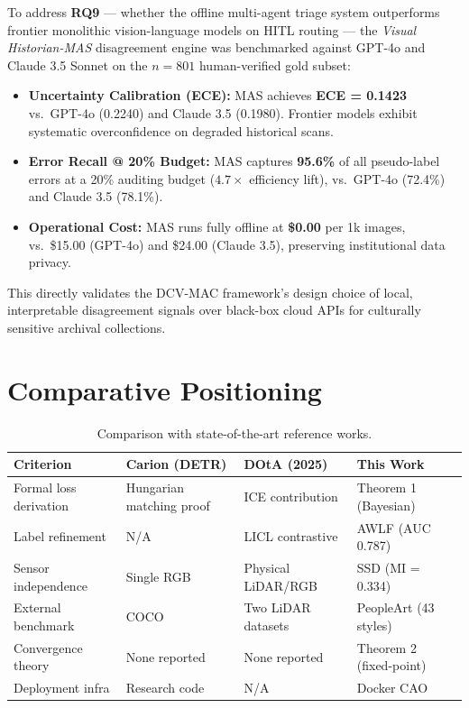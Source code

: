 \documentclass[11pt,a4paper]{article}
\theoremstyle{plain}
\begin{document}
To address \textbf{RQ9} --- whether the offline multi-agent triage system outperforms frontier monolithic vision-language models on HITL routing --- the \textit{Visual Historian-MAS} disagreement engine was benchmarked against GPT-4o and Claude 3.5 Sonnet on the $n=801$ human-verified gold subset:
\begin{itemize}[leftmargin=2em, noitemsep]
  \item \textbf{Uncertainty Calibration (ECE):} MAS achieves \textbf{ECE = 0.1423} vs.\ GPT-4o (0.2240) and Claude 3.5 (0.1980). Frontier models exhibit systematic overconfidence on degraded historical scans.
  \item \textbf{Error Recall @ 20\% Budget:} MAS captures \textbf{95.6\%} of all pseudo-label errors at a 20\% auditing budget ($4.7\times$ efficiency lift), vs.\ GPT-4o (72.4\%) and Claude 3.5 (78.1\%).
  \item \textbf{Operational Cost:} MAS runs fully offline at \textbf{\$0.00} per 1k images, vs.\ \$15.00 (GPT-4o) and \$24.00 (Claude 3.5), preserving institutional data privacy.
\end{itemize}

This directly validates the DCV-MAC framework's design choice of local, interpretable disagreement signals over black-box cloud APIs for culturally sensitive archival collections.

\section{Comparative Positioning}

\begin{table}[h]
\centering
\caption{Comparison with state-of-the-art reference works.}
\renewcommand{\arraystretch}{1.35}
\begin{tabularx}{\linewidth}{lXXX}
\toprule
\textbf{Criterion} & \textbf{Carion (DETR)} & \textbf{DOtA (2025)} & \textbf{This Work} \\
\midrule
Formal loss derivation & Hungarian matching proof & ICE contribution & Theorem 1 (Bayesian) \\
Label refinement & N/A & LICL contrastive & AWLF (AUC 0.787) \\
Sensor independence & Single RGB & Physical LiDAR/RGB & SSD (MI = 0.334) \\
External benchmark & COCO & Two LiDAR datasets & PeopleArt (43 styles) \\
Convergence theory & None reported & None reported & Theorem 2 (fixed-point) \\
Deployment infra & Research code & N/A & Docker CAO \\
\bottomrule
\end{tabularx}
\end{table}
\end{document}
